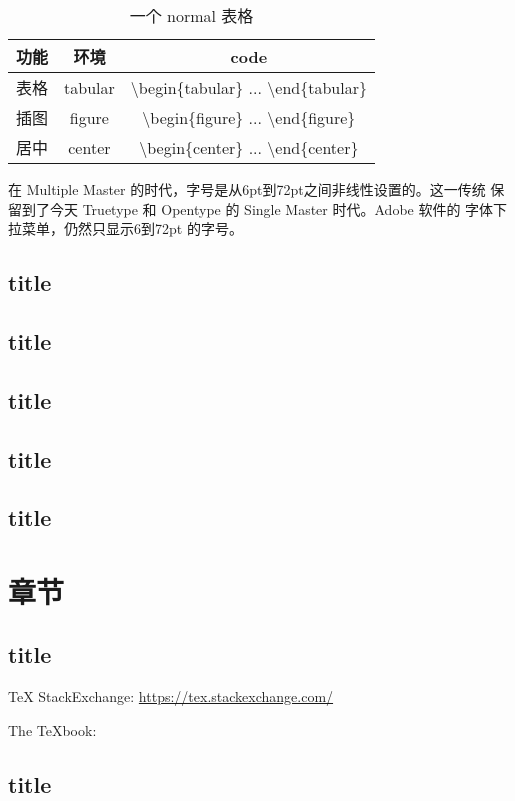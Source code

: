 \documentclass[twoside]{fduthesis}
\begin{document}
\begin{table}[h]
  \centering
  \caption{一个 normal 表格}
  \begin{tabular}{ccc}
    \hline
    \bfseries 功能 & \bfseries 环境 & \bfseries code \\
    \hline
    表格 & tabular & \ttfamily \textbackslash begin\{tabular\} ... \textbackslash end\{tabular\} \\
    插图 & figure  & \ttfamily \textbackslash begin\{figure\}  ... \textbackslash end\{figure\}  \\
    居中 & center  & \ttfamily \textbackslash begin\{center\}  ... \textbackslash end\{center\}  \\
    \hline
  \end{tabular}
\end{table}

在 Multiple Master 的时代，字号是从6pt到72pt之间非线性设置的。这一传统
保留到了今天 Truetype 和 Opentype 的 Single Master 时代。Adobe 软件的
字体下拉菜单，仍然只显示6到72pt 的字号。

\section{title}
\section{title}
\section{title}
\section{title}
\section{title}

\chapter{章节}
\section{title}
\TeX{} StackExchange: \url{https://tex.stackexchange.com/}

The \TeX book: \cite{knuth1986texbook}
\section{title}
\end{document}
